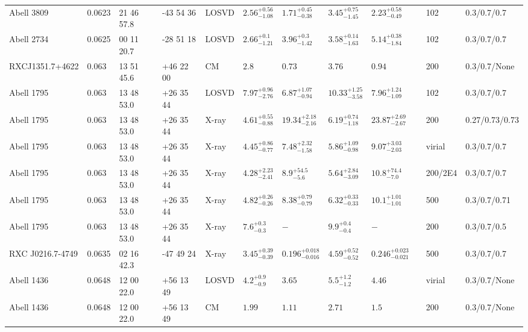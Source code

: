 \begin{landscape}
\begin{center}
{\begin{longtable}{llllllllllll}
Abell 3809 & 0.0623 & 21 46 57.8 & -43 54 36 & LOSVD & ${2.56}^{+0.56}_{-1.08}$ & ${1.71}^{+0.45}_{-0.38}$ & ${3.45}^{+0.75}_{-1.45}$ & ${2.23}^{+0.58}_{-0.49}$ & \citet{WO10.1} & 102 & 0.3/0.7/0.7 \\
Abell 2734 & 0.0625 & 00 11 20.7 & -28 51 18 & LOSVD & ${2.66}^{+0.1}_{-1.21}$ & ${3.96}^{+0.3}_{-1.42}$ & ${3.58}^{+0.14}_{-1.63}$ & ${5.14}^{+0.38}_{-1.84}$ & \citet{WO10.1} & 102 & 0.3/0.7/0.7 \\
RXCJ1351.7+4622 & 0.063 & 13 51 45.6 & +46 22 00 & CM & ${2.8}^{}_{}$ & ${0.73}^{}_{}$ & ${3.76}^{}_{}$ & ${0.94}^{}_{}$ & \citet{RI06.1} & 200 & 0.3/0.7/None \\
Abell 1795 & 0.063 & 13 48 53.0 & +26 35 44 & LOSVD & ${7.97}^{+0.96}_{-2.76}$ & ${6.87}^{+1.07}_{-0.94}$ & ${10.33}^{+1.25}_{-3.58}$ & ${7.96}^{+1.24}_{-1.09}$ & \citet{WO10.1} & 102 & 0.3/0.7/0.7 \\
Abell 1795 & 0.063 & 13 48 53.0 & +26 35 44 & X-ray & ${4.61}^{+0.55}_{-0.88}$ & ${19.34}^{+2.18}_{-2.16}$ & ${6.19}^{+0.74}_{-1.18}$ & ${23.87}^{+2.69}_{-2.67}$ & \citet{BA14.1} & 200 & 0.27/0.73/0.73 \\
Abell 1795 & 0.063 & 13 48 53.0 & +26 35 44 & X-ray & ${4.45}^{+0.86}_{-0.77}$ & ${7.48}^{+2.32}_{-1.58}$ & ${5.86}^{+1.09}_{-0.98}$ & ${9.07}^{+3.03}_{-2.03}$ & \citet{SC07.1} & virial & 0.3/0.7/0.7 \\
Abell 1795 & 0.063 & 13 48 53.0 & +26 35 44 & X-ray & ${4.28}^{+2.23}_{-2.41}$ & ${8.9}^{+54.5}_{-5.6}$ & ${5.64}^{+2.84}_{-3.09}$ & ${10.8}^{+74.4}_{-7.0}$ & \citet{VO06.1} & 200/2E4 & 0.3/0.7/0.7 \\
Abell 1795 & 0.063 & 13 48 53.0 & +26 35 44 & X-ray & ${4.82}^{+0.26}_{-0.26}$ & ${8.38}^{+0.79}_{-0.79}$ & ${6.32}^{+0.33}_{-0.33}$ & ${10.1}^{+1.01}_{-1.01}$ & \citet{VI06.1} & 500 & 0.3/0.7/0.71 \\
Abell 1795 & 0.063 & 13 48 53.0 & +26 35 44 & X-ray & ${7.6}^{+0.3}_{-0.3}$ & ${-}^{}_{}$ & ${9.9}^{+0.4}_{-0.4}$ & ${-}^{}_{}$ & \citet{XU01.1} & 200 & 0.3/0.7/0.5 \\
RXC J0216.7-4749 & 0.0635 & 02 16 42.3 & -47 49 24 & X-ray & ${3.45}^{+0.39}_{-0.39}$ & ${0.196}^{+0.018}_{-0.016}$ & ${4.59}^{+0.52}_{-0.52}$ & ${0.246}^{+0.023}_{-0.021}$ & \citet{DE10.1} & 500 & 0.3/0.7/0.7 \\
Abell 1436 & 0.0648 & 12 00 22.0 & +56 13 49 & LOSVD & ${4.2}^{+0.9}_{-0.9}$ & ${3.65}^{}_{}$ & ${5.5}^{+1.2}_{-1.2}$ & ${4.46}^{}_{}$ & \citet{AB11.1} & virial & 0.3/0.7/None \\
Abell 1436 & 0.0648 & 12 00 22.0 & +56 13 49 & CM & ${1.99}^{}_{}$ & ${1.11}^{}_{}$ & ${2.71}^{}_{}$ & ${1.5}^{}_{}$ & \citet{RI06.1} & 200 & 0.3/0.7/None \\

\end{longtable}}
\end{center}
\end{landscape}

